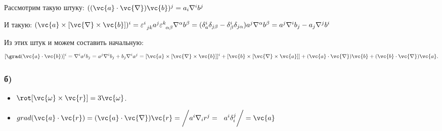 \begin{itemize}
	Рассмотрим такую штуку: $((\vc{a} \cdot \vc{\nabla}) \vc{b})^j
	=
	a_i \nabla^i b^j
	$

	И такую: $
	(\vc{a} \times [\vc{\nabla} \times \vc{b}])^i
	=
	\varepsilon_{\phantom{0} j k}^{i} a^j \varepsilon_{\phantom{0} \alpha \beta}^{k} \nabla^\alpha b^\beta
	=
	(\delta_a^i \delta_{j \beta} - \delta_\beta^i \delta_{j \alpha}) a^j \nabla^\alpha b^\beta
	=
	a^j \nabla^i b_j - a_j \nabla^j b^i
	$

	Из этих штук и можем составить начальную:
	 $$[\grad(\vc{a} \cdot \vc{b})]^i = \nabla^i a^j b_j = a^j \nabla^i b_j + b_j \nabla^i a^j
	 =
	 [\vc{a} \times [\vc{\nabla} \times \vc{b}]]^i + [\vc{b} \times [\vc{\nabla} \times \vc{a}]] + (\vc{a} \cdot \vc{\nabla}) \vc{b} + (\vc{b} \cdot \vc{\nabla}) \vc{a}.
	 $$
\end{itemize}

\subsubsection*{б)}
\begin{itemize}
	\item $\rot [\vc{\omega} \times \vc{r}] = 3 \vc{\omega}$.

	\item 
	$ grad(\vc{a} \cdot \vc{r}) = (\vc{a} \cdot \vc{\nabla}) \vc{r} = \bigg\slash a^i \nabla_i r^j =\phantom{\frac{1}{1}} a^i \delta_i^j \bigg\slash = \vc{a}$
\end{itemize}

